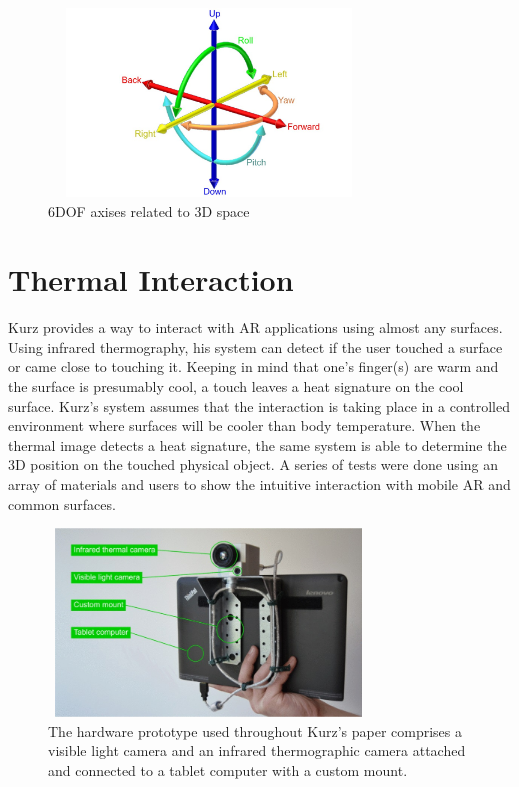 \documentclass{sig-alternate}
\begin{document}
\begin{figure}
	\includegraphics[width=8.5cm, height=5cm]{6DOF_en}
	\caption{6DOF axises related to 3D space \cite{6DOF}}
	\label{fig:6DOF}
\end{figure}  




\section{Thermal Interaction}
\label{sec:Thermal Interaction}
Kurz \cite{Thermal} provides a way to interact with AR applications using almost any surfaces. Using infrared thermography, his system can detect if the user touched a surface or came close to touching it. Keeping in mind that one's finger(s) are warm and the surface is presumably cool, a touch leaves a heat signature on the cool surface. Kurz's system assumes that the interaction is taking place in a controlled environment where surfaces will be cooler than body temperature. When the thermal image detects a heat signature, the same system is able to determine the 3D position on the touched physical object. A series of tests were done using an array of materials and users to show the intuitive interaction with mobile AR and common surfaces. 

\begin{figure}
	\includegraphics[width=8.5cm, height=5cm]{Hardware2}
	\caption{The hardware prototype used throughout Kurz's paper comprises a visible light camera and an infrared thermographic camera attached and connected to a tablet computer with a custom mount. \cite{Thermal}}
	\label{fig:hardware}
\end{figure}
\end{document}
